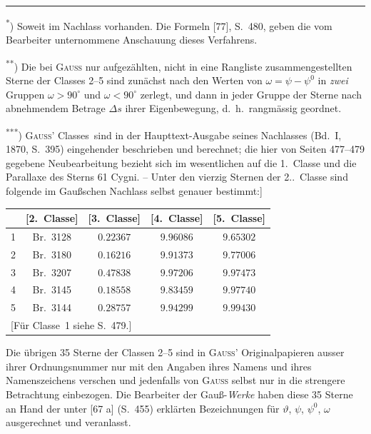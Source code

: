 \documentclass[12pt,a4paper]{article}
\theoremstyle{plain}
\theoremstyle{definition}
\theoremstyle{remark}
\begin{document}
\medskip
\noindent\rule{\textwidth}{0.4pt}
\begin{footnotesize}
\textsuperscript{*}) Soweit im Nachlass vorhanden. Die Formeln [77], S.~480, geben die
vom Bearbeiter unternommene Anschauung dieses Verfahrens.

\textsuperscript{**}) Die bei \textsc{Gau\ss} nur aufgez\"ahlten, nicht in eine Rangliste
zusammengestellten Sterne der \glqq Classes 2--5 sind zun\"achst nach den Werten
von $\omega = \psi - \psi^{0}$ in \textit{zwei} Gruppen $\omega > 90^{\circ}$ und $\omega < 90^{\circ}$ zerlegt,
und dann in jeder Gruppe der Sterne nach abnehmendem Betrage $\Delta s$
ihrer Eigenbewegung, d.~h.~rangm\"assig geordnet.

\textsuperscript{***}) \textsc{Gau\ss'} \glqq Classes\grqq\ sind in der Haupttext-Ausgabe seines Nachlasses
(Bd.~I, 1870, S.~395) eingehender beschrieben und berechnet; die hier von
Seiten 477--479 gegebene Neubearbeitung bezieht sich im wesentlichen auf
die 1.~Classe und die Parallaxe des Sterns 61 Cygni. -- Unter den vierzig
Sternen der 2..~Classe sind folgende im Gau\ss schen Nachlass selbst
genauer bestimmt:]

\begin{center}
\begin{tabular}{|c|c|c|c|c|}
\hline
[\textsc{Gau\ss} No.] & [2.~Classe] & [3.~Classe] & [4.~Classe] & [5.~Classe] \\
\hline
1 & Br.~3128 & $0.22367$ & $9.96086$ & $9.65302$ \\
2 & Br.~3180 & $0.16216$ & $9.91373$ & $9.77006$ \\
3 & Br.~3207 & $0.47838$ & $9.97206$ & $9.97473$ \\
4 & Br.~3145 & $0.18558$ & $9.83459$ & $9.97740$ \\
5 & Br.~3144 & $0.28757$ & $9.94299$ & $9.99430$ \\
\hline
\multicolumn{5}{l}{[F\"ur Classe~1 siehe S.~479.]} \\
\end{tabular}
\end{center}

Die \"ubrigen 35 Sterne der Classen 2--5 sind in \textsc{Gau\ss'} Originalpapieren
ausser ihrer Ordnungsnummer nur mit den Angaben ihres Namens und
ihres Namenszeichens verschen und jedenfalls von \textsc{Gau\ss} selbst nur
in die strengere Betrachtung einbezogen. Die Bearbeiter der Gau\ss-\textit{Werke}
haben diese 35 Sterne an Hand der unter [67 a] (S.~455) erkl\"arten
Bezeichnungen f\"ur $\vartheta$, $\psi$, $\psi^{0}$, $\omega$ ausgerechnet und veranlasst.
\end{footnotesize}
\end{document}
